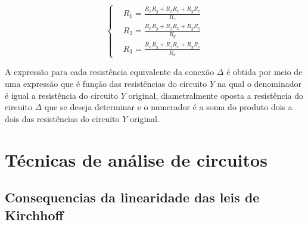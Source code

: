 \documentclass[12pt,fleqn]{book} %
\begin{document}
    \begin{equation}
    \left\{\begin{aligned} & 
          R_1=\frac{R_x R_y+R_z R_x+R_y R_z}{R_z}\\& 
          R_2=\frac{R_x R_y+R_z R_x+R_y R_z}{R_y}\\&
          R_3=\frac{R_x R_y+R_z R_x+R_y R_z}{R_x}
    \end{aligned}\right.
    \end{equation}
    
    \begin{remark}
    A expressão para cada resistência equivalente da conexão $\Delta$ é obtida por meio de uma expressão que é função das resistências do circuito $Y$ na qual o denominador é igual a resistência do circuito $Y$ original, diametralmente oposta a resistência do circuito $\Delta$ que se deseja determinar e o numerador é a soma do produto dois a dois das resistências do circuito $Y$ original.
    \end{remark}
        
	
\chapter{Técnicas de análise de circuitos}

\section{Consequencias da linearidade das leis de Kirchhoff}
\end{document}
